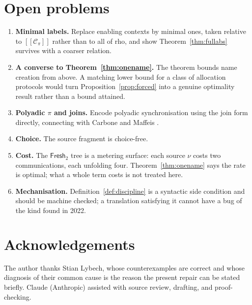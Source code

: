 \documentclass[11pt]{article}
\theoremstyle{definition}
\theoremstyle{plain}
\theoremstyle{remark}
\newcommand{\enc}[1]{[\![#1]\!]}
\newcommand{\Frsh}{\mathsf{Fresh}_2}
\newcommand{\Ctx}{\mathscr{C}}
\begin{document}
\section{Open problems}\label{sec:open}

\begin{enumerate}[label=\arabic*.,leftmargin=2.2em]
\item \textbf{Minimal labels.} Replace enabling contexts by minimal
ones, taken relative to $\enc{\Ctx_\pi}$ rather than to all of rho, and
show Theorem~\ref{thm:fullabs} survives with a coarser relation.
\item \textbf{A converse to Theorem~\ref{thm:onename}.} The theorem
bounds name creation from above. A matching lower bound for a class of
allocation protocols would turn Proposition~\ref{prop:forced} into a
genuine optimality result rather than a bound attained.
\item \textbf{Polyadic $\pi$ and joins.} Encode polyadic synchronisation
using the join form directly, connecting with Carbone and Maffeis
\cite{CarboneMaffeis03}.
\item \textbf{Choice.} The source fragment is choice-free.
\item \textbf{Cost.} The $\Frsh$ tree is a metering surface: each source
$\nu$ costs two communications, each unfolding four.
Theorem~\ref{thm:onename} says the rate is optimal; what a whole term
costs is not treated here.
\item \textbf{Mechanisation.} Definition~\ref{def:discipline} is a
syntactic side condition and should be machine checked; a translation
satisfying it cannot have a bug of the kind found in 2022.
\end{enumerate}

\section*{Acknowledgements}

The author thanks Stian Lybech, whose counterexamples are correct and
whose diagnosis of their common cause is the reason the present repair
can be stated briefly. Claude (Anthropic) assisted with source review,
drafting, and proof-checking.
\end{document}
